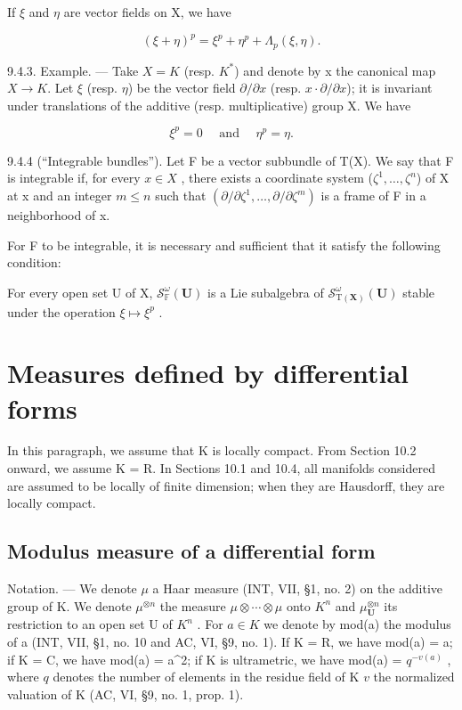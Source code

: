 If \(\xi\) and \(\eta\) are vector fields on X, we have

\[
(\xi + \eta) ^ {p} = \xi^ {p} + \eta^ {p} + \Lambda_ {p} (\xi , \eta).\tag{5}
\]

9.4.3. Example. --- Take \(X = K\) (resp. \(K^*\)) and denote by x the canonical map \(X \to K\). Let \(\xi\) (resp. \(\eta\)) be the vector field \(\partial/\partial x\) (resp. \(x\cdot\partial/\partial x\)); it is invariant under translations of the additive (resp. multiplicative) group X. We have

\[
\xi^ {p} = 0 \quad \text { and } \quad \eta^ {p} = \eta .\tag{6}
\]

9.4.4 (“Integrable bundles”). Let F be a vector subbundle of T(X). We say that F is integrable if, for every \(x \in X\) , there exists a coordinate system (\(\zeta^{1}, \ldots, \zeta^{n}\)) of X at x and an integer \(m \leqslant n\) such that \((\partial/\partial\zeta^{1}, \ldots, \partial/\partial\zeta^{m})\) is a frame of F in a neighborhood of x.

For F to be integrable, it is necessary and sufficient that it satisfy the following condition:

For every open set U of X, \(\mathcal{S}_{\mathbb{F}}^{\omega}(\mathbf{U})\) is a Lie subalgebra of \(\mathcal{S}_{\mathrm{T}(\mathbf{X})}^{\omega}(\mathbf{U})\) stable under the operation \(\xi \mapsto \xi^{p}\) .

\section{Measures defined by differential forms}

In this paragraph, we assume that K is locally compact. From Section 10.2 onward, we assume K = R. In Sections 10.1 and 10.4, all manifolds considered are assumed to be locally of finite dimension; when they are Hausdorff, they are locally compact.

\subsection{Modulus measure of a differential form}

Notation. --- We denote \(\mu\) a Haar measure (INT, VII, §1, no. 2) on the additive group of K. We denote \(\mu^{\otimes n}\) the measure \(\mu \otimes \cdots \otimes \mu\) onto \(K^n\) and \(\mu_{\mathbf{U}}^{\otimes n}\) its restriction to an open set U of \(K^n\) . For \(a \in K\) we denote by mod(a) the modulus of a (INT, VII, §1, no. 10 and AC, VI, §9, no. 1). If K = R, we have mod(a) = \textbar a\textbar; if K = C, we have mod(a) = \textbar a\textbar\^{}2; if K is ultrametric, we have mod(a) = \(q^{-v(a)}\) , where \(q\) denotes the number of elements in the residue field of K \(v\) the normalized valuation of K (AC, VI, §9, no. 1, prop. 1).

